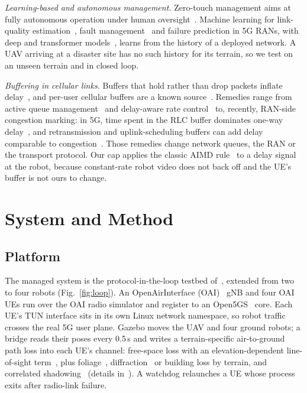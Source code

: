 \textit{Learning-based and autonomous management.} Zero-touch management aims
at fully autonomous operation under human oversight~\cite{coronado2022zsm}.
Machine learning for link-quality estimation~\cite{cerar2021lqe}, fault
management~\cite{mulvey2019fault} and failure prediction in 5G RANs, with deep
and transformer models~\cite{islam2023dnn,hasan2024gentrap}, learns from the
history of a deployed network. A UAV arriving at a disaster site has no such
history for its terrain, so we test on an unseen terrain and in closed loop.

\textit{Buffering in cellular links.} Buffers that hold rather than drop
packets inflate delay~\cite{gettys2012bufferbloat}, and per-user cellular
buffers are a known source~\cite{jiang2012tackling}. Remedies range from active
queue management~\cite{nichols2012codel} and delay-aware rate
control~\cite{winstein2013sprout} to, recently, RAN-side congestion marking:
in 5G, time spent in the RLC buffer dominates one-way
delay~\cite{wan2025l4span}, and retransmission and uplink-scheduling buffers can
add delay comparable to congestion~\cite{liu2025fog}. Those remedies change
network queues, the RAN or the transport protocol. Our cap applies the classic AIMD
rule~\cite{chiu1989aimd} to a delay signal at the robot, because constant-rate
robot video does not back off and the UE's buffer is not ours to change.
\section{System and Method}
\label{sec:method}

\subsection{Platform}
\label{sec:platform}
The managed system is the protocol-in-the-loop testbed
of~\cite{makhubela2026satnac}, extended from two to four robots
(Fig.~\ref{fig:loop}). An OpenAirInterface (OAI)~\cite{nikaein2014oai} gNB and
four OAI UEs run over the OAI radio simulator and register to an
Open5GS~\cite{open5gs} core. Each UE's TUN interface sits in its own Linux
network namespace, so robot traffic crosses the real 5G user plane. Gazebo
moves the UAV and four ground robots; a bridge reads their poses every 0.5\,s
and writes a terrain-specific air-to-ground path loss into each UE's channel:
free-space loss with an elevation-dependent line-of-sight
term~\cite{alhourani2014modeling}, plus foliage~\cite{weissberger1982},
diffraction~\cite{itup526} or building loss by terrain, and correlated
shadowing~\cite{gudmundson1991} (details in~\cite{makhubela2026satnac}). A
watchdog relaunches a UE whose process exits after radio-link failure.

